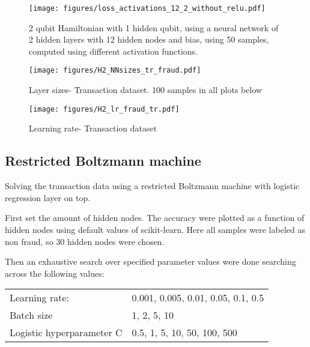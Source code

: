 \documentclass[../main.tex]{subfiles}
\begin{document}
\begin{figure}
    \begin{center}
        \texttt{[image: figures/loss\_activations\_12\_2\_without\_relu.pdf]}
        \caption{2 qubit Hamiltonian with 1 hidden qubit, using a neural network of 2 hidden layers with 12 hidden nodes and bias, using 50 samples, computed using different activation functions.}
        \label{fig:3}
    \end{center}
\end{figure}


\begin{figure}
    \begin{center}
        \texttt{[image: figures/H2\_NNsizes\_tr\_fraud.pdf]}
        \caption{Layer sizes- Transaction dataset. 100 samples in all plots below}
        \label{fig:2}
    \end{center}
\end{figure}

\begin{figure}
    \begin{center}
        \texttt{[image: figures/H2\_lr\_fraud\_tr.pdf]}
        \caption{Learning rate- Transaction dataset}
        \label{fig:1}
    \end{center}
\end{figure}

\subsection{Restricted Boltzmann machine}
Solving the transaction data using a restricted Boltzmann machine with logistic regression layer on top.

First set the amount of hidden nodes. The accuracy were plotted as a function of hidden nodes using default values of scikit-learn. Here all samples were labeled as non fraud, so 30 hidden nodes were chosen.

Then an exhaustive search over specified parameter values were done searching across the following values:

\begin{center}
\begin{tabular}{l l}
 Learning rate: & 0.001, 0.005, 0.01, 0.05, 0.1, 0.5 \\ 
 Batch size & 1, 2, 5, 10  \\  
 Logistic hyperparameter C & 0.5, 1, 5, 10, 50, 100, 500    
\end{tabular}
\end{center}
\end{document}
